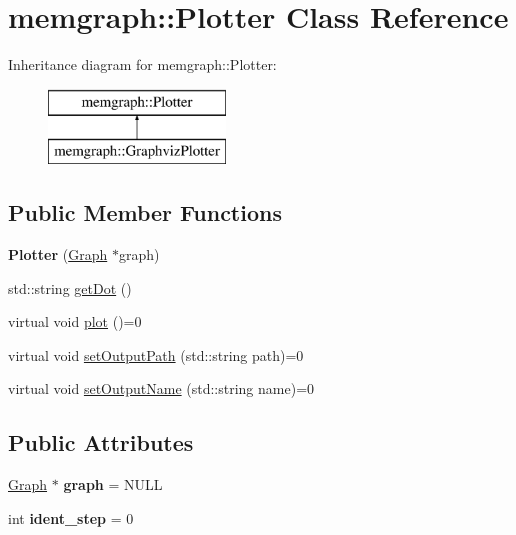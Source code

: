 \hypertarget{classmemgraph_1_1_plotter}{}\section{memgraph\+:\+:Plotter Class Reference}
\label{classmemgraph_1_1_plotter}
Inheritance diagram for memgraph\+:\+:Plotter\+:\begin{figure}[H]
\begin{center}
\leavevmode
\includegraphics[height=2.000000cm]{classmemgraph_1_1_plotter}
\end{center}
\end{figure}
\subsection*{Public Member Functions}
\begin{DoxyCompactItemize}
\item 
{\bfseries Plotter} (\hyperlink{classmemgraph_1_1_graph}{Graph} $\ast$graph)\hypertarget{classmemgraph_1_1_plotter_a5e31299b3c18b96a63f237b150482bd3}{}\label{classmemgraph_1_1_plotter_a5e31299b3c18b96a63f237b150482bd3}

\item 
std\+::string \hyperlink{classmemgraph_1_1_plotter_a7429124ab9a43b66b4d4e5e2d289ba39}{get\+Dot} ()
\item 
virtual void \hyperlink{classmemgraph_1_1_plotter_ae06fdcd0fba0d8a05fe843f214d96f08}{plot} ()=0
\item 
virtual void \hyperlink{classmemgraph_1_1_plotter_abf04b57cbd17f0a9fe03ac3c7dedc7da}{set\+Output\+Path} (std\+::string path)=0
\item 
virtual void \hyperlink{classmemgraph_1_1_plotter_af8baffa9e328876376e0f5c466bc4103}{set\+Output\+Name} (std\+::string name)=0
\end{DoxyCompactItemize}
\subsection*{Public Attributes}
\begin{DoxyCompactItemize}
\item 
\hyperlink{classmemgraph_1_1_graph}{Graph} $\ast$ {\bfseries graph} = N\+U\+LL\hypertarget{classmemgraph_1_1_plotter_a01b3974c5b04e781bae8daeb0fd31193}{}\label{classmemgraph_1_1_plotter_a01b3974c5b04e781bae8daeb0fd31193}

\item 
int {\bfseries ident\+\_\+step} = 0\hypertarget{classmemgraph_1_1_plotter_ac9a1549c31d345df9bab09c29e7349d4}{}\label{classmemgraph_1_1_plotter_ac9a1549c31d345df9bab09c29e7349d4}

\end{DoxyCompactItemize}


